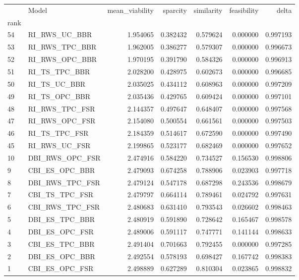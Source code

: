 \begin{tabular}{llrrrrr}
 & Model & mean_viability & sparcity & similarity & feasibility & delta \\
rank &  &  &  &  &  &  \\
54 & RI\_RWS\_UC\_BBR & 1.954065 & 0.382432 & 0.579624 & 0.000000 & 0.997193 \\
53 & RI\_RWS\_TPC\_BBR & 1.962005 & 0.386277 & 0.579307 & 0.000000 & 0.996673 \\
52 & RI\_RWS\_OPC\_BBR & 1.970195 & 0.391790 & 0.584326 & 0.000000 & 0.996913 \\
51 & RI\_TS\_TPC\_BBR & 2.028200 & 0.428975 & 0.602673 & 0.000000 & 0.996685 \\
50 & RI\_TS\_UC\_BBR & 2.035025 & 0.434112 & 0.608963 & 0.000000 & 0.997209 \\
49 & RI\_TS\_OPC\_BBR & 2.035436 & 0.429765 & 0.609424 & 0.000000 & 0.997101 \\
48 & RI\_RWS\_TPC\_FSR & 2.144357 & 0.497647 & 0.648407 & 0.000000 & 0.997568 \\
47 & RI\_RWS\_OPC\_FSR & 2.154080 & 0.500554 & 0.661561 & 0.000000 & 0.997503 \\
46 & RI\_TS\_TPC\_FSR & 2.184359 & 0.514617 & 0.672590 & 0.000000 & 0.997490 \\
45 & RI\_RWS\_UC\_FSR & 2.199865 & 0.523177 & 0.682469 & 0.000000 & 0.997652 \\
10 & DBI\_RWS\_OPC\_FSR & 2.474916 & 0.584220 & 0.734527 & 0.156530 & 0.998806 \\
9 & CBI\_ES\_OPC\_BBR & 2.479093 & 0.674258 & 0.788906 & 0.023903 & 0.997718 \\
8 & DBI\_RWS\_TPC\_FSR & 2.479124 & 0.547178 & 0.687298 & 0.243536 & 0.998679 \\
7 & CBI\_TS\_TPC\_FSR & 2.479797 & 0.664114 & 0.789461 & 0.024792 & 0.997631 \\
6 & CBI\_RWS\_TPC\_FSR & 2.480683 & 0.631410 & 0.793543 & 0.026602 & 0.998463 \\
5 & DBI\_ES\_TPC\_BBR & 2.480919 & 0.591890 & 0.728642 & 0.165467 & 0.998578 \\
4 & DBI\_ES\_OPC\_FSR & 2.489006 & 0.591117 & 0.747771 & 0.141144 & 0.998633 \\
3 & CBI\_ES\_TPC\_BBR & 2.491404 & 0.701663 & 0.792455 & 0.000000 & 0.997285 \\
2 & DBI\_ES\_OPC\_BBR & 2.492554 & 0.578193 & 0.698427 & 0.167742 & 0.998383 \\
1 & CBI\_ES\_OPC\_FSR & 2.498889 & 0.627289 & 0.810304 & 0.023865 & 0.998832 \\
\end{tabular}
